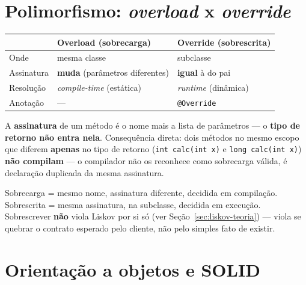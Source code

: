 \section{Polimorfismo: \textit{overload} x \textit{override}}

\begin{conceito}
\begin{center}
\begin{tabular}{@{}p{2.6cm}p{4.6cm}p{4.6cm}@{}}
\toprule
& \textbf{Overload (sobrecarga)} & \textbf{Override (sobrescrita)} \\
\midrule
Onde & mesma classe & subclasse \\
Assinatura & \textbf{muda} (parâmetros diferentes) & \textbf{igual} à do
pai \\
Resolução & \textit{compile-time} (estática) & \textit{runtime}
(dinâmica) \\
Anotação & --- & \texttt{@Override} \\
\bottomrule
\end{tabular}
\end{center}

A \textbf{assinatura} de um método é o nome mais a lista de parâmetros ---
o \textbf{tipo de retorno não entra nela}. Consequência direta: dois
métodos no mesmo escopo que diferem \textbf{apenas} no tipo de retorno
(\texttt{int calc(int x)} e \texttt{long calc(int x)}) \textbf{não
compilam} --- o compilador não os reconhece como sobrecarga válida, é
declaração duplicada da mesma assinatura.
\end{conceito}

\begin{cuidado}
Sobrecarga = mesmo nome, assinatura diferente, decidida em compilação.
Sobrescrita = mesma assinatura, na subclasse, decidida em execução.
Sobrescrever \textbf{não} viola Liskov por si só (ver
Seção~\ref{sec:liskov-teoria}) --- viola se quebrar o contrato esperado
pelo cliente, não pelo simples fato de existir.
\end{cuidado}

\section{Orientação a objetos e SOLID}

